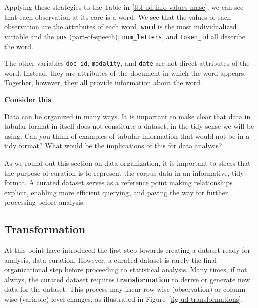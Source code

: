 \documentclass[
  letterpaper,
]{latex/krantz}
\theoremstyle{definition}
\theoremstyle{remark}
\begin{document}
Applying these strategies to the Table in \ref{tbl-ud-info-values-masc},
we can see that each observation at its core is a word. We see that the
values of each observation are the attributes of each word.
\texttt{word} is the most individualized variable and the \texttt{pos}
(part-of-speech), \texttt{num\_letters}, and \texttt{token\_id} all
describe the word.

The other variables \texttt{doc\_id}, \texttt{modality}, and
\texttt{date} are not direct attributes of the word. Instead, they are
attributes of the document in which the word appears. Together, however,
they all provide information about the word.

\begin{tcolorbox}[enhanced jigsaw, colframe=quarto-callout-color-frame, breakable, bottomrule=.15mm, arc=.35mm, left=2mm, opacityback=0, rightrule=.15mm, colback=white, toprule=.15mm, leftrule=.75mm]

\textbf{ Consider this}

Data can be organized in many ways. It is important to make clear that
data in tabular format in itself does not constitute a dataset, in the
tidy sense we will be using. Can you think of examples of tabular
information that would not be in a tidy format? What would be the
implications of this for data analysis?

\end{tcolorbox}

As we round out this section on data organization, it is important to
stress that the purpose of curation is to represent the corpus data in
an informative, tidy format. A curated dataset serves as a reference
point making relationships explicit, enabling more efficient querying,
and paving the way for further processing before analysis.

\subsection{Transformation}\label{sec-ud-transformation}

At this point have introduced the first step towards creating a dataset
ready for analysis, data curation. However, a curated dataset is rarely
the final organizational step before proceeding to statistical analysis.
Many times, if not always, the curated dataset requires
\textbf{transformation} to derive or generate new data for the dataset.
This process may incur row-wise (observation) or column-wise (variable)
level changes, as illustrated in Figure~\ref{fig-ud-transformations}.
\end{document}
